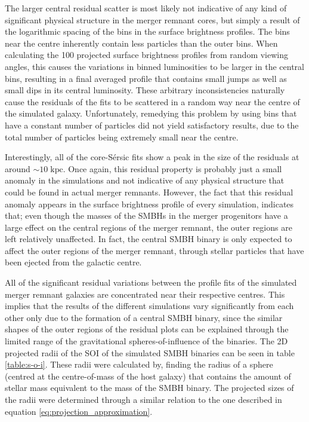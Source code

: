 \documentclass[english, twoside]{HYgradu}
\begin{document}
The larger central residual scatter is most likely not indicative of any kind of significant physical structure in the merger remnant cores, but simply a result of the logarithmic spacing of the bins in the surface brightness profiles. The bins near the centre inherently contain less particles than the outer bins. When calculating the 100 projected surface brightness profiles from random viewing angles, this causes the variations in binned luminosities to be larger in the central bins, resulting in a final averaged profile that contains small jumps as well as small dips in its central luminosity. These arbitrary inconsistencies naturally cause the residuals of the fits to be scattered in a random way near the centre of the simulated galaxy. Unfortunately, remedying this problem by using bins that have a constant number of particles did not yield satisfactory results, due to the total number of particles being extremely small near the centre.

Interestingly, all of the core-Sérsic fits show a peak in the size of the residuals at around $\sim 10 \; \mathrm{kpc}$. Once again, this residual property is probably just a small anomaly in the simulations and not indicative of any physical structure that could be found in actual merger remnants. However, the fact that this residual anomaly appears in the surface brightness profile of every simulation, indicates that; even though the masses of the SMBHs in the merger progenitors have a large effect on the central regions of the merger remnant, the outer regions are left relatively unaffected. In fact, the central SMBH binary is only expected to affect the outer regions of the merger remnant, through stellar particles that have been ejected from the galactic centre. 

All of the significant residual variations between the profile fits of the simulated merger remnant galaxies are concentrated near their respective centres. This implies that the results of the different simulations vary significantly from each other only due to the formation of a central SMBH binary, since the similar shapes of the outer regions of the residual plots can be explained through the limited range of the gravitational spheres-of-influence of the binaries. The 2D projected radii of the SOI of the simulated SMBH binaries can be seen in table \ref{table:s-o-i}. These radii were calculated by, finding the radius of a sphere (centred at the centre-of-mass of the host galaxy) that contains the amount of stellar mass equivalent to the mass of the SMBH binary. The projected sizes of the radii were determined through a similar relation to the one described in equation \ref{eq:projection_approximation}.
\end{document}

